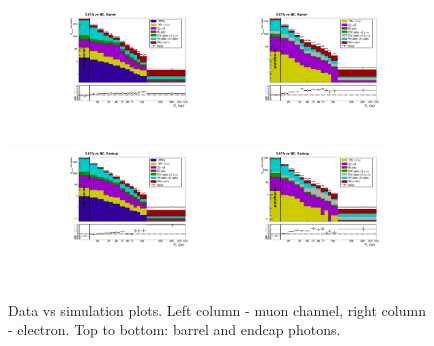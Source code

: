 \begin{figure}[htb]
  \begin{center}
   \includegraphics[width=0.45\textwidth]{../figs/figs_v11/MUON_WGamma/PrepareYields/c_TotalDATAvsMC_Barrel__phoEt.pdf}\includegraphics[width=0.45\textwidth]{../figs/figs_v11/ELECTRON_WGamma/PrepareYields/c_TotalDATAvsMC_Barrel__phoEt.pdf}
   \includegraphics[width=0.45\textwidth]{../figs/figs_v11/MUON_WGamma/PrepareYields/c_TotalDATAvsMC_Endcap__phoEt.pdf}\includegraphics[width=0.45\textwidth]{../figs/figs_v11/ELECTRON_WGamma/PrepareYields/c_TotalDATAvsMC_Endcap__phoEt.pdf}
  \caption{Data vs simulation plots. Left column - muon channel, right column - electron. Top to bottom: barrel and endcap photons.}
  \label{fig:DATAvsMC}
  \end{center}
\end{figure}



